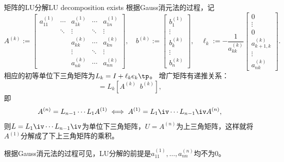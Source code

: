 \begin{theorem}
    {矩阵的LU分解}{LU decomposition exists}
    根据Gauss消元法的过程，记
    \[
        A^{(k)}:=\begin{bmatrix}
            a_{11}^{(1)}&\cdots&a_{1k}^{(1)}&\cdots&a_{1n}^{(1)}\\
            &\ddots&\vdots&\ddots&\vdots\\
            &&a_{kk}^{(k)}&\cdots&a_{kn}^{(k)}\\
            &&\vdots&\ddots&\vdots\\
            &&a_{nk}^{(k)}&\cdots&a_{nn}^{(k)}
        \end{bmatrix},\quad
        b^{(k)}:=\begin{bmatrix}
            b_1^{(1)}\\\vdots\\b_k^{(k)}\\\vdots\\b_n^{(k)}
        \end{bmatrix},\quad\ell_k:=-\frac1{a_{kk}^{(k)}}\begin{bmatrix}
            0\\\vdots\\0\\a_{k+1,k}^{(k)}\\\vdots\\a_{nk}^{(k)}
        \end{bmatrix}.
    \]
    相应的初等单位下三角矩阵为$L_k=I+\ell_ke_k\tp$。
    增广矩阵有递推关系：
    \begin{equation}
        [A^{(k+1)}\enspace b^{(k+1)}]=L_k[A^{(k)}\enspace b^{(k)}],
    \end{equation}
    即
    \[
        A^{(n)}=L_{n-1}\cdots L_1A^{(1)}\iff A^{(1)}=L_1\iv\cdots L_{n-1}\iv A^{(n)},
    \]
    则$L=L_1\iv\cdots L_{n-1}\iv$为单位下三角矩阵，$U=A^{(n)}$为上三角矩阵，这样就将$A^{(1)}$分解成了下上三角矩阵的乘积。    
\end{theorem}

\begin{remark}
    根据Gauss消元法的过程可见，LU分解的前提是$a_{11}^{(1)},\ldots,a_{nn}^{(n)}$均不为0。
\end{remark}

